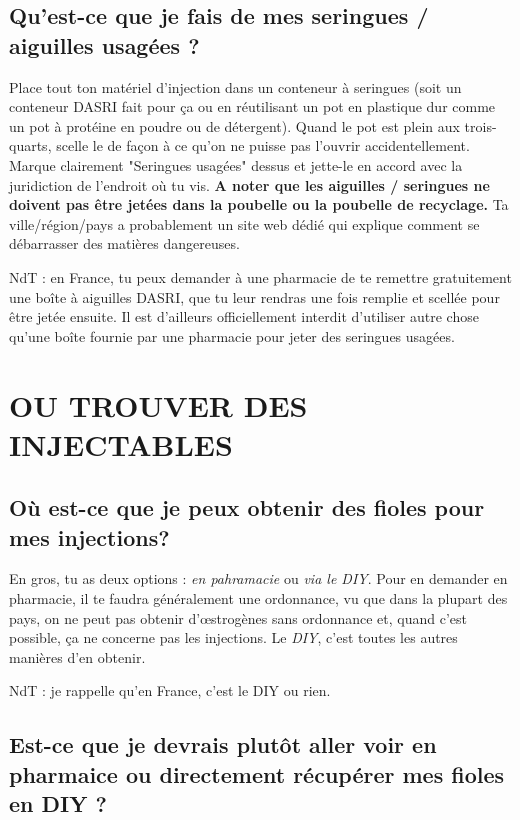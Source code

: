 \documentclass{article}
\begin{document}
\subsection{Qu'est-ce que je fais de mes seringues / aiguilles usagées ?}\label{5-27}

Place tout ton matériel d'injection dans un conteneur à seringues (soit un conteneur DASRI fait pour ça ou en réutilisant un pot en plastique dur comme un pot à protéine en poudre ou de détergent). Quand le pot est plein aux trois-quarts, scelle le de façon à ce qu'on ne puisse pas l'ouvrir accidentellement. Marque clairement "Seringues usagées" dessus et jette-le en accord avec la juridiction de l'endroit où tu vis. \textbf{A noter que les aiguilles / seringues ne doivent pas être jetées dans la poubelle ou la poubelle de recyclage.} Ta ville/région/pays a probablement un site web dédié qui explique comment se débarrasser des matières dangereuses.

NdT : en France, tu peux demander à une pharmacie de te remettre gratuitement une boîte à aiguilles DASRI, que tu leur rendras une fois remplie et scellée pour être jetée ensuite. Il est d'ailleurs officiellement interdit d'utiliser autre chose qu'une boîte fournie par une pharmacie pour jeter des seringues usagées.

\section{OU TROUVER DES INJECTABLES}\label{sv}

\subsection{Où est-ce que je peux obtenir des fioles pour mes injections?}

En gros, tu as deux options : \textit{en pahramacie} ou \textit{via le DIY}. Pour en demander en pharmacie, il te faudra généralement une ordonnance, vu que dans la plupart des pays, on ne peut pas obtenir d'œstrogènes sans ordonnance et, quand c'est possible, ça ne concerne pas les injections. Le \textit{DIY}, c'est toutes les autres manières d'en obtenir.

NdT : je rappelle qu'en France, c'est le DIY ou rien. 

\subsection{Est-ce que je devrais plutôt aller voir en pharmaice ou directement récupérer mes fioles en DIY ?}
\end{document}

